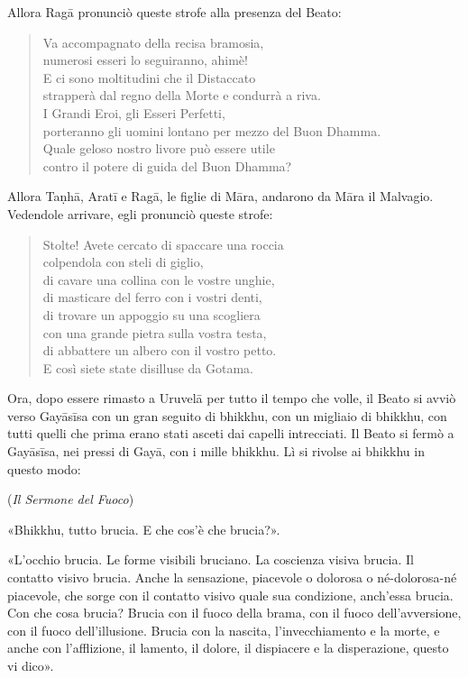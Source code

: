 Allora Ragā pronunciò queste strofe alla presenza del Beato:


\begin{quote}
Va accompagnato della recisa bramosia, \\
numerosi esseri lo seguiranno, ahimè! \\
E ci sono moltitudini che il Distaccato \\
strapperà dal regno della Morte e condurrà a riva. \\
I Grandi Eroi, gli Esseri Perfetti, \\
porteranno gli uomini lontano per mezzo del Buon Dhamma. \\
Quale geloso nostro livore può essere utile \\
contro il potere di guida del Buon Dhamma?
\end{quote}

Allora Taṇhā, Aratī e Ragā, le figlie di Māra, andarono da Māra il
Malvagio. Vedendole arrivare, egli pronunciò queste strofe:


\begin{quote}
Stolte! Avete cercato di spaccare una roccia \\
colpendola con steli di giglio, \\
di cavare una collina con le vostre unghie, \\
di masticare del ferro con i vostri denti, \\
di trovare un appoggio su una scogliera \\
con una grande pietra sulla vostra testa, \\
di abbattere un albero con il vostro petto. \\
E così siete state disilluse da Gotama.
\end{quote}



 Ora, dopo essere rimasto a Uruvelā per tutto il tempo che
volle, il Beato si avviò verso Gayāsīsa con un gran seguito di bhikkhu,
con un migliaio di bhikkhu, con tutti quelli che prima erano stati
asceti dai capelli intrecciati. Il Beato si fermò a Gayāsīsa, nei pressi
di Gayā, con i mille bhikkhu. Lì si rivolse ai bhikkhu in questo modo:


\label{pag73}(\emph{Il Sermone del Fuoco})


«Bhikkhu, tutto brucia. E che cos’è che brucia?».


«L’occhio brucia. Le forme visibili bruciano. La coscienza visiva
brucia. Il contatto visivo brucia. Anche la sensazione, piacevole o
dolorosa o né-dolorosa-né piacevole, che sorge con il contatto visivo
quale sua condizione, anch’essa brucia. Con che cosa brucia? Brucia con
il fuoco della brama, con il fuoco dell’avversione, con il fuoco
dell’illusione. Brucia con la nascita, l’invecchiamento e la morte, e
anche con l’afflizione, il lamento, il dolore, il dispiacere e la
disperazione, questo vi dico».


